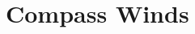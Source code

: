 \hypertarget{group___e_g_x_math-_angle_conversions-_compass_winds}{}\section{Compass Winds}
\label{group___e_g_x_math-_angle_conversions-_compass_winds}
